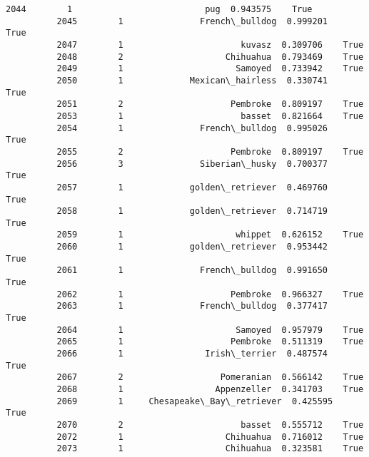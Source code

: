 \documentclass[11pt]{article}
\begin{document}
\begin{Verbatim}[commandchars=\\\{\}]
          2044        1                          pug  0.943575    True   
          2045        1               French\_bulldog  0.999201    True   
          2047        1                       kuvasz  0.309706    True   
          2048        2                    Chihuahua  0.793469    True   
          2049        1                      Samoyed  0.733942    True   
          2050        1             Mexican\_hairless  0.330741    True   
          2051        2                     Pembroke  0.809197    True   
          2053        1                       basset  0.821664    True   
          2054        1               French\_bulldog  0.995026    True   
          2055        2                     Pembroke  0.809197    True   
          2056        3               Siberian\_husky  0.700377    True   
          2057        1             golden\_retriever  0.469760    True   
          2058        1             golden\_retriever  0.714719    True   
          2059        1                      whippet  0.626152    True   
          2060        1             golden\_retriever  0.953442    True   
          2061        1               French\_bulldog  0.991650    True   
          2062        1                     Pembroke  0.966327    True   
          2063        1               French\_bulldog  0.377417    True   
          2064        1                      Samoyed  0.957979    True   
          2065        1                     Pembroke  0.511319    True   
          2066        1                Irish\_terrier  0.487574    True   
          2067        2                   Pomeranian  0.566142    True   
          2068        1                  Appenzeller  0.341703    True   
          2069        1     Chesapeake\_Bay\_retriever  0.425595    True   
          2070        2                       basset  0.555712    True   
          2072        1                    Chihuahua  0.716012    True   
          2073        1                    Chihuahua  0.323581    True   
          

\end{Verbatim}
\end{document}

